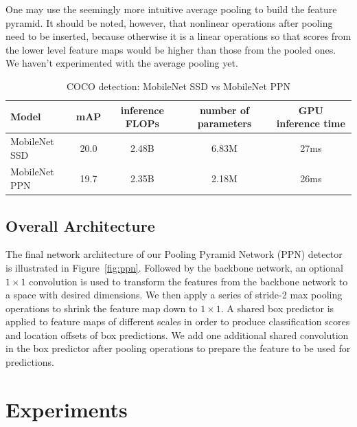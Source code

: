 \documentclass[10pt,twocolumn,letterpaper]{article}
\begin{document}
One may use the seemingly more intuitive average pooling
to build the feature pyramid.
It should be noted, however, that
nonlinear operations after pooling need to be inserted,
because otherwise it is a linear operations so that
scores from the lower level feature maps would be higher than
those from the pooled ones.
We haven't experimented with the average pooling yet.


\begin{table}[t]
\begin{center}
\begin{tabular}{l|c|c|c|c}
Model & mAP & inference FLOPs & number of parameters & GPU inference time\\
\hline
\hline
MobileNet SSD & 20.0 & 2.48B & 6.83M & 27ms \\
\hline
MobileNet PPN & 19.7 & 2.35B & 2.18M & 26ms \\
\end{tabular}
\end{center}
\caption{COCO detection: MobileNet SSD vs MobileNet PPN}
\label{comparison}
\end{table}



\subsection{Overall Architecture}


The final network architecture of our Pooling Pyramid
Network (PPN) detector is illustrated in
Figure~\ref{fig:ppn}.  Followed by the backbone network, an
optional $1\times 1$ convolution is used to transform the features
from the backbone network to a space with desired
dimensions.  We then apply a series of stride-2 max pooling
operations to shrink the feature map down to $1\times 1$.  A shared
box predictor is applied to feature maps of different scales
in order to produce classification scores and location
offsets of box predictions.  We add one additional shared
convolution in the box predictor after pooling operations to
prepare the feature to be used for predictions.


\section{Experiments}
\end{document}
